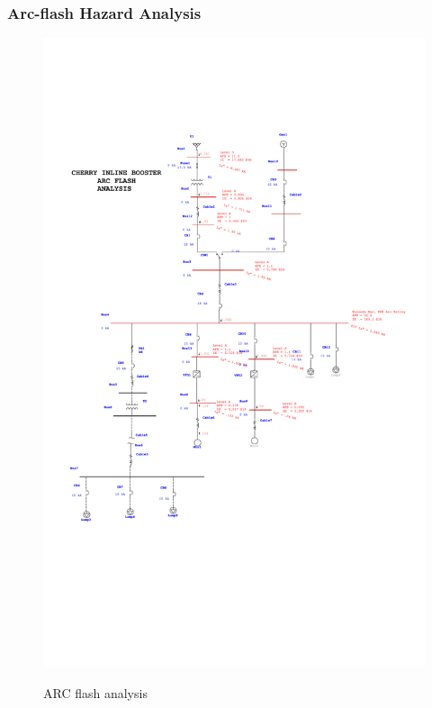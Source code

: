 \subsubsection{Arc-flash Hazard Analysis }
\begin{figure}[!htb]
	\includegraphics[width=\textwidth]{figures/ARC1_SLD_Arc_Flash_Analysis.pdf} \\
	\caption{ARC flash analysis}
	\label{fig_ch04_elecaudit_ARC1_SLD_Arc_Flash_Analysis} 
\end{figure}


